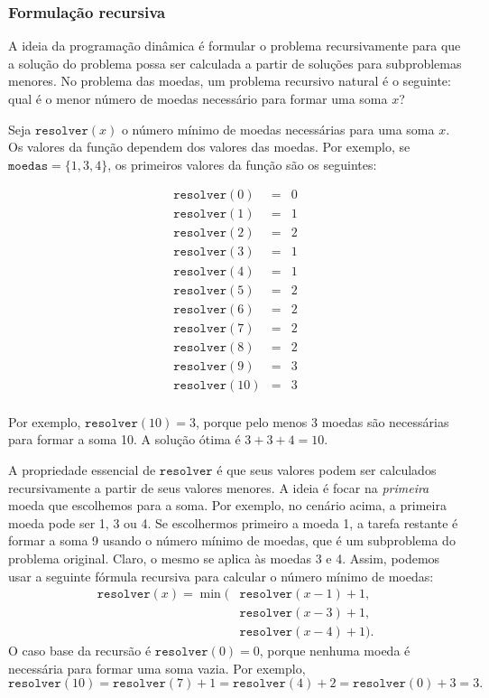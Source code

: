 \subsubsection{Formulação recursiva}

A ideia da programação dinâmica é
formular o problema recursivamente para
que a solução do problema possa ser
calculada a partir de soluções para subproblemas menores.
No problema das moedas, um problema recursivo natural
é o seguinte:
qual é o menor número de moedas
necessário para formar uma soma $x$?

Seja $\texttt{resolver}(x)$
o número mínimo
de moedas necessárias para uma soma $x$.
Os valores da função dependem dos
valores das moedas.
Por exemplo, se $\texttt{moedas} = \{1,3,4\}$,
os primeiros valores da função são os seguintes:

\[
\begin{array}{lcl}
\texttt{resolver}(0) & = & 0 \\
\texttt{resolver}(1) & = & 1 \\
\texttt{resolver}(2) & = & 2 \\
\texttt{resolver}(3) & = & 1 \\
\texttt{resolver}(4) & = & 1 \\
\texttt{resolver}(5) & = & 2 \\
\texttt{resolver}(6) & = & 2 \\
\texttt{resolver}(7) & = & 2 \\
\texttt{resolver}(8) & = & 2 \\
\texttt{resolver}(9) & = & 3 \\
\texttt{resolver}(10) & = & 3 \\
\end{array}
\]

Por exemplo, $\texttt{resolver}(10)=3$,
porque pelo menos 3 moedas são necessárias
para formar a soma 10.
A solução ótima é $3+3+4=10$.

A propriedade essencial de $\texttt{resolver}$ é
que seus valores podem ser
calculados recursivamente a partir de seus valores menores.
A ideia é focar na \emph{primeira}
moeda que escolhemos para a soma.
Por exemplo, no cenário acima,
a primeira moeda pode ser 1, 3 ou 4.
Se escolhermos primeiro a moeda 1,
a tarefa restante é formar a soma 9
usando o número mínimo de moedas,
que é um subproblema do problema original.
Claro, o mesmo se aplica às moedas 3 e 4.
Assim, podemos usar a seguinte fórmula recursiva
para calcular o número mínimo de moedas:
\begin{equation*}
\begin{split}
\texttt{resolver}(x) = \min( & \texttt{resolver}(x-1)+1, \\
                           & \texttt{resolver}(x-3)+1, \\
                           & \texttt{resolver}(x-4)+1).
\end{split}
\end{equation*}
O caso base da recursão é $\texttt{resolver}(0)=0$,
porque nenhuma moeda é necessária para formar uma soma vazia.
Por exemplo,
\[ \texttt{resolver}(10) = \texttt{resolver}(7)+1 = \texttt{resolver}(4)+2 = \texttt{resolver}(0)+3 = 3.\]

